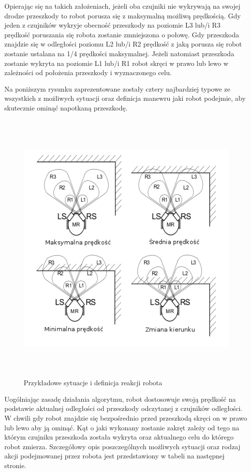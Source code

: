 Opierając się na takich założeniach, jeżeli oba czujniki nie
wykrywają na swojej drodze przeszkody to robot porusza się z maksymalną możliwą
prędkością. Gdy jeden z czujników wykryje obecność przeszkody na poziomie  L3
lub/i R3 prędkość poruszania się robota zostanie zmniejszona o połowę. Gdy
przeszkoda znajdzie się w odległości poziomu L2 lub/i R2 prędkość z jaką porusza
się robot zostanie ustalana na 1/4 prędkości maksymalnej. Jeżeli natomiast
przeszkoda zostanie wykryta na poziomie L1 lub/i R1 robot skręci w prawo lub lewo
w zależności od położenia przeszkody i wyznaczonego celu.

Na poniższym rysunku zaprezentowane zostały cztery najbardziej typowe ze
wszystkich z możliwych sytuacji oraz definicja manewru jaki robot
podejmie, aby skutecznie ominąć napotkaną przeszkodę. 

\begin{figure}[h!]
 \centering
 \includegraphics[height=140mm]{../images/ch04/obs_avoid_algorithm.png}
 \caption{Przykładowe sytuacje i definicja reakcji robota}
 \label{fig:IRTestCases}
\end{figure}

Uogólniając zasadę działania algorytmu, robot dostosowuje swoją prędkość na
podstawie aktualnej odległości od przeszkody odczytanej z czujników odległości.
W chwili gdy robot znajdzie się bezpośrednio przed przeszkodą skręci on w prawo
lub lewo aby ją ominąć. Kąt o jaki wykonany zostanie zakręt zależy od tego na
którym czujniku przeszkoda została wykryta oraz aktualnego celu do którego robot
zmierza. Szczegółowy opis poszczególnych możliwych sytuacji oraz rodzaj akcji
podejmowanej przez robota jest przedstawiony w tabeli na następnej stronie. 

